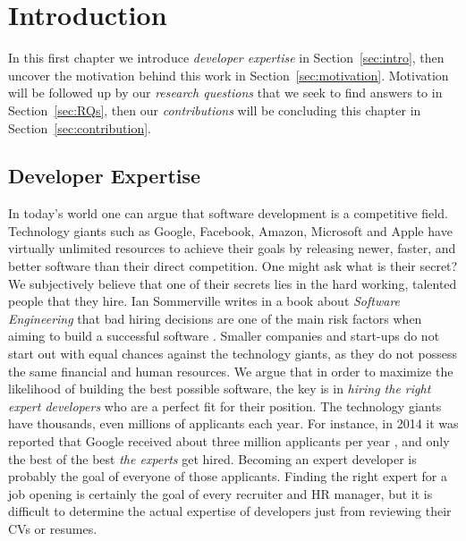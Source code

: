 \chapter{Introduction}

    In this first chapter we introduce \emph{developer expertise} in Section~\ref{sec:intro}, then uncover the motivation behind this work in Section~\ref{sec:motivation}. Motivation will be followed up by our \emph{research questions} that we seek to find answers to in Section~\ref{sec:RQs}, then our \emph{contributions} will be concluding this chapter in Section~\ref{sec:contribution}.
    
    \section{Developer Expertise\label{sec:intro}}
    
        In today's world one can argue that software development is a competitive field. Technology giants such as Google, Facebook, Amazon, Microsoft and Apple have virtually unlimited resources to achieve their goals by releasing newer, faster, and better software than their direct competition. One might ask what is their secret? We subjectively believe that one of their secrets lies in the hard working, talented people that they hire. Ian Sommerville writes in a book about \emph{Software Engineering} that bad hiring decisions are one of the main risk factors when aiming to build a successful software \cite{sommerville2016software}. Smaller companies and start-ups do not start out with equal chances against the technology giants, as they do not possess the same financial and human resources. We argue that in order to maximize the likelihood of building the best possible software, the key is in \emph{hiring the right expert developers} who are a perfect fit for their position. The technology giants have thousands, even millions of applicants each year. For instance, in 2014 it was reported that Google received about three million applicants per year \cite{nisen_2014}, and only the best of the best \emph{the experts} get hired. Becoming an expert developer is probably the goal of everyone of those applicants. Finding the right expert for a job opening is certainly the goal of every recruiter and HR manager, but it is difficult to determine the actual expertise of developers just from reviewing their CVs or resumes.
    
